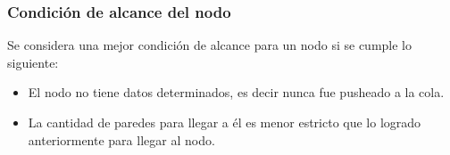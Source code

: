 \subsubsection*{Condición de alcance del nodo}
Se considera una mejor condición de alcance para un nodo si se cumple lo siguiente:
\begin{itemize}
	\item El nodo no tiene datos determinados, es decir nunca fue pusheado a la cola.
	\item La cantidad de paredes para llegar a él es menor estricto que lo logrado anteriormente para llegar al nodo.

\end{itemize}